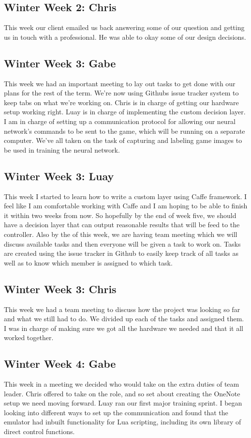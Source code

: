 \documentclass[onecolumn, draftclsnofoot,10pt, compsoc]{IEEEtran}
\begin{document}
\subsection{Winter Week 2: Chris}
This week our client emailed us back answering some of our question and getting us in touch with a professional. He was able to okay some of our design decisions.
\subsection{Winter Week 3: Gabe}
This week we had an important meeting to lay out tasks to get done with our plans for the rest of the term. We're now using Githubs issue tracker system to keep tabs on what we're working on. Chris is in charge of getting our hardware setup working right. Luay is in charge of implementing the custom decision layer. I am in charge of setting up a communication protocol for allowing our neural network's commands to be sent to the game, which will be running on a separate computer. We've all taken on the task of capturing and labeling game images to be used in training the neural network.
\subsection{Winter Week 3: Luay}
This week I started to learn how to write a custom layer using Caffe framework. I feel like I am comfortable working with Caffe and I am hoping to be able to finish it within two weeks from now. So hopefully by the end of week five, we should have a decision layer that can output reasonable results that will be feed to the controller. Also by the of this week, we are having team meeting which we will discuss available tasks and then everyone will be given a task to work on. Tasks are created using the issue tracker in Github to easily keep track of all tasks as well as to know which member is assigned to which task.
\subsection{Winter Week 3: Chris}
This week we had a team meeting to discuss how the project was looking so far and what we still had to do. We divided up each of the tasks and assigned them. I was in charge of making sure we got all the hardware we needed and that it all worked together.
\subsection{Winter Week 4: Gabe}
This week in a meeting we decided who would take on the extra duties of team leader. Chris offered to take on the role, and so set about creating the OneNote setup we need moving forward. Luay ran our first major training sprint. I began looking into different ways to set up the communication and found that the emulator had inbuilt functionality for Lua scripting, including its own library of direct control functions.
\end{document}
